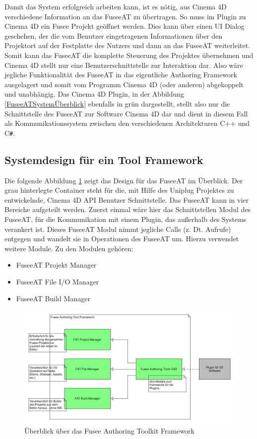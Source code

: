 \documentclass[pagesize, paper=a4, fontsize=12pt, titlepage=true, headings=small, headnosepline, abstractoff, liststotoc, nochapterprefix, plainheadsepline, twoside]{scrreprt}
\newcommand{\CS}{C\texttt{\#}}
\begin{document}
Damit das System erfolgreich arbeiten kann, ist es nötig, aus Cinema 4D verschiedene Information an das FuseeAT zu übertragen. So muss im Plugin zu Cinema 4D ein Fusee Projekt geöffnet werden. Dies kann über einen UI Dialog geschehen, der die vom Benutzer eingetragenen Informationen über den Projektort auf der Festplatte des Nutzers und dann an das FuseeAT weiterleitet. Somit kann das FuseeAT die komplette Steuerung des Projektes übernehmen und Cinema 4D stellt nur eine Benutzerschnittstelle zur Interaktion dar. Also wäre jegliche Funktionalität des FuseeAT in das eigentliche Authoring Framework ausgelagert und somit vom Programm Cinema 4D (oder anderen) abgekoppelt und unabhängig. Das Cinema 4D Plugin, in der Abbildung \ref{FuseeATSystemÜberblick} ebenfalls in grün dargestellt, stellt also nur die Schnittstelle des FuseeAT zur Software Cinema 4D dar und dient in diesem Fall als Kommunikationssystem zwischen den verschiedenen Architekturen C++ und \CS.

\subsection{Systemdesign für ein Tool Framework}
Die folgende Abbildung \ref{FrameworkÜberblick} zeigt das Design für das FuseeAT im Überblick. Der grau hinterlegte Container steht für die, mit Hilfe des Uniplug Projektes zu entwickelnde, Cinema 4D API Benutzer Schnittstelle. Das FuseeAT kann in vier Bereiche aufgeteilt werden. Zuerst einmal wäre hier das Schnittstellen Modul des FuseeAT, für die Kommunikation mit einem Plugin, das außerhalb des Systems verankert ist. Dieses FuseeAT Modul nimmt jegliche Calls (z. Dt. Aufrufe) entgegen und wandelt sie in Operationen des FuseeAT um. Hierzu verwendet weitere Module. Zu den Modulen gehören:
\begin{itemize}
\item FuseeAT Projekt Manager
\item FuseeAT File I/O Manager
\item FuseeAT Build Manager
\end{itemize}

\begin{figure}[ht]
	\centering
	\includegraphics[width=\linewidth]{Bilder/Ueberblick_Framework.jpg}
	\caption{Überblick über das Fusee Authoring Toolkit Framework}
	\label{FrameworkÜberblick}
\end{figure}
\end{document}
